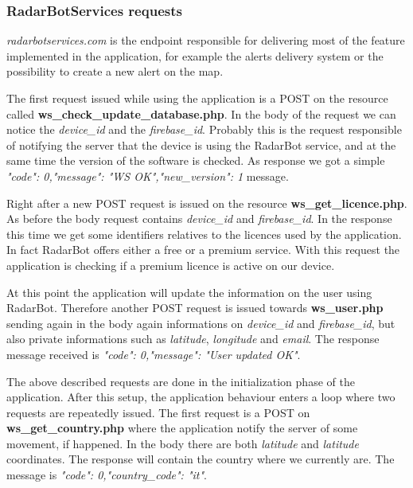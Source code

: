 		\subsubsection{RadarBotServices requests}
			\par \textit{radarbotservices.com} is the endpoint responsible for delivering most of the feature implemented in the application, for example the alerts delivery system or the possibility to create a new alert on the map. \newline
			\par The first request issued while using the application is a POST on the resource called \textbf{ws\_check\_update\_database.php}. In the body of the request we can notice the \textit{device\_id} and the \textit{firebase\_id}. Probably this is the request responsible of notifying the server that the device is using the RadarBot service, and at the same time the version of the software is checked. As response we got a simple \textit{"code": 0,"message": "WS OK","new\_version": 1} message.\newline
			\par Right after a new POST request is issued on the resource \textbf{ws\_get\_licence.php}. As before the body request contains \textit{device\_id} and \textit{firebase\_id}. In the response this time we get some identifiers relatives to the licences used by the application. In fact RadarBot offers either a free or a premium service. With this request the application is checking if a premium licence is active on our device.\newline
			\par At this point the application will update the information on the user using RadarBot. Therefore another POST request is issued towards \textbf{ws\_user.php} sending again in the body again informations on  \textit{device\_id} and \textit{firebase\_id}, but also private informations such as \textit{latitude}, \textit{longitude} and \textit{email}. The response message received is \textit{"code": 0,"message": "User updated OK"}.\newline
			\par The above described requests are done in the initialization phase of the application. After this setup, the application behaviour enters a loop where two requests are repeatedly issued. \newline
			The first request is a POST on \textbf{ws\_get\_country.php} where the application notify the server of some movement, if happened. In the body there are both \textit{latitude} and \textit{latitude} coordinates. The response will contain the country where we currently are. The message is \textit{"code": 0,"country\_code": "it"}. \newline
